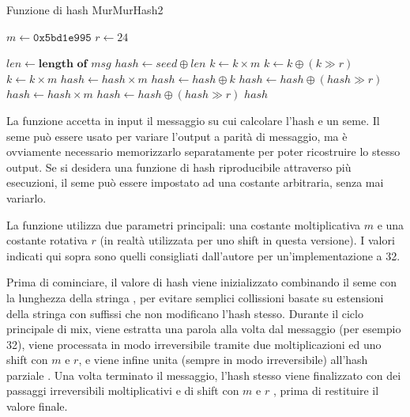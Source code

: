 \begin{algorithm}
\caption{Funzione di hash MurMurHash2}
\label{alg:murmurhash2}
\begin{algorithmic}
	\State \lnote[2em]$m \gets \mathtt{0x5bd1e995}$ 
	\State \lnote[2em]$r \gets 24$ 

	\State $len \gets \textbf{length of}$ $msg$
	\State \lnote[2em]$hash \gets seed \oplus len$
	 
		\State \lnote[38pt]$k \gets k \times m$
		\State $k \gets k \oplus (k \gg r)$
		\State $k \gets k \times m$
		\State $hash \gets hash \times m$
		\State \lnote[38pt]$hash \gets hash \oplus k$
	\EndFor
	\State \lnote[2em]$hash \gets hash \oplus (hash \gg r)$ 
	\State $hash \gets hash \times m$
	\State $hash \gets hash \oplus (hash \gg r)$
	\State \Return $hash$
\EndProcedure
\end{algorithmic}
\end{algorithm}

La funzione accetta in input il messaggio su cui calcolare l'hash e un seme. Il seme può essere
usato per variare l'output a parità di messaggio, ma è ovviamente necessario memorizzarlo
separatamente per poter ricostruire lo stesso output. Se si desidera una funzione di hash
riproducibile attraverso più esecuzioni, il seme può essere impostato ad una costante arbitraria,
senza mai variarlo.

La funzione utilizza due parametri principali: una costante moltiplicativa $m$  e una
costante rotativa $r$  (in realtà utilizzata per uno shift in questa versione). I valori
indicati qui sopra sono quelli consigliati dall'autore per un'implementazione a \SI{32}{\bit}.

Prima di cominciare, il valore di hash viene inizializzato combinando il seme con la lunghezza della
stringa , per evitare semplici collissioni basate su estensioni della stringa con suffissi
che non modificano l'hash stesso. Durante il ciclo principale di mix, viene estratta una parola alla
volta dal messaggio (per esempio \SI{32}{\bit}), viene processata in modo irreversibile tramite due
moltiplicazioni ed uno shift con $m$ e $r$, e viene infine unita (sempre in modo irreversibile)
all'hash parziale . Una volta terminato il messaggio, l'hash stesso viene finalizzato con
dei passaggi irreversibili moltiplicativi e di shift con $m$ e $r$ , prima di restituire il
valore finale.

